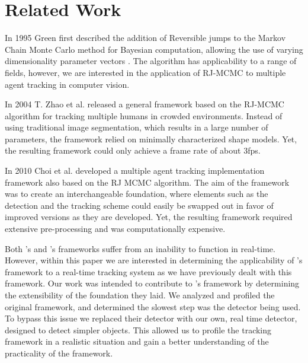 \section{Related Work}
\label{sec:related}

In 1995 Green first described the addition of Reversible jumps to the Markov Chain Monte Carlo method for Bayesian
computation, allowing the use of varying dimensionality parameter vectors \cite{green1995reversible}. The algorithm has
applicability to a range of fields, however, we are interested in the application of RJ-MCMC to multiple agent tracking in computer
vision.

In 2004 T. Zhao et al. \cite{zhao2004tracking} released a general framework based on the RJ-MCMC algorithm for tracking
multiple humans in crowded environments. Instead of using traditional image segmentation, which results in a large number of
parameters, the framework relied on minimally characterized shape models. Yet, the resulting framework could only achieve a
frame rate of about 3fps.

In 2010 Choi et al. \cite{choi2010multiple} developed a multiple agent tracking implementation framework also based on the RJ
MCMC algorithm. The aim of the framework was to create an interchangeable foundation, where elements such as the detection
and the tracking scheme could easily be swapped out in favor of improved versions as they are developed. Yet, the resulting
framework required extensive pre-processing and was computationally expensive.

Both \cite{zhao2004tracking}'s and \cite{choi2010multiple}'s frameworks suffer from an inability to function in real-time. However,
within this paper we are interested in determining the applicability of \cite{choi2010multiple}'s framework to a real-time tracking
system as we have previously dealt with this framework. Our work was intended to contribute to \cite{choi2010multiple}'s
framework by determining the extensibility of the foundation they laid. We analyzed and profiled the original framework, and
determined the slowest step was the detector being used. To bypass this issue we replaced their detector with our own, real time
detector, designed to detect simpler objects. This allowed us to profile the tracking framework in a realistic situation and gain a
better understanding of the practicality of the framework.